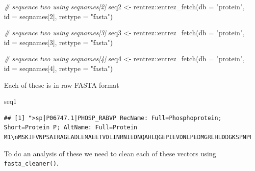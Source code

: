 \documentclass[
]{book}
\newenvironment{Shaded}{\begin{snugshade}}{\end{snugshade}}
\newcommand{\AttributeTok}[1]{\textcolor[rgb]{0.77,0.63,0.00}{#1}}
\newcommand{\CommentTok}[1]{\textcolor[rgb]{0.56,0.35,0.01}{\textit{#1}}}
\newcommand{\DecValTok}[1]{\textcolor[rgb]{0.00,0.00,0.81}{#1}}
\newcommand{\FunctionTok}[1]{\textcolor[rgb]{0.00,0.00,0.00}{#1}}
\newcommand{\NormalTok}[1]{#1}
\newcommand{\OtherTok}[1]{\textcolor[rgb]{0.56,0.35,0.01}{#1}}
\newcommand{\SpecialCharTok}[1]{\textcolor[rgb]{0.00,0.00,0.00}{#1}}
\newcommand{\StringTok}[1]{\textcolor[rgb]{0.31,0.60,0.02}{#1}}
\begin{document}
\begin{Shaded}
\begin{Highlighting}[]
\CommentTok{\# sequence two using seqnames[2]}
\NormalTok{seq2 }\OtherTok{\textless{}{-}}\NormalTok{ rentrez}\SpecialCharTok{::}\FunctionTok{entrez\_fetch}\NormalTok{(}\AttributeTok{db =} \StringTok{"protein"}\NormalTok{, }
                          \AttributeTok{id =}\NormalTok{ seqnames[}\DecValTok{2}\NormalTok{], }
                          \AttributeTok{rettype =} \StringTok{"fasta"}\NormalTok{) }

\CommentTok{\# sequence two using seqnames[3]}
\NormalTok{seq3 }\OtherTok{\textless{}{-}}\NormalTok{ rentrez}\SpecialCharTok{::}\FunctionTok{entrez\_fetch}\NormalTok{(}\AttributeTok{db =} \StringTok{"protein"}\NormalTok{, }
                          \AttributeTok{id =}\NormalTok{ seqnames[}\DecValTok{3}\NormalTok{], }
                          \AttributeTok{rettype =} \StringTok{"fasta"}\NormalTok{)}

\CommentTok{\# sequence two using seqnames[4]}
\NormalTok{seq4 }\OtherTok{\textless{}{-}}\NormalTok{ rentrez}\SpecialCharTok{::}\FunctionTok{entrez\_fetch}\NormalTok{(}\AttributeTok{db =} \StringTok{"protein"}\NormalTok{, }
                          \AttributeTok{id =}\NormalTok{ seqnames[}\DecValTok{4}\NormalTok{], }
                          \AttributeTok{rettype =} \StringTok{"fasta"}\NormalTok{)}
\end{Highlighting}
\end{Shaded}

Each of these is in raw FASTA format

\begin{Shaded}
\begin{Highlighting}[]
\NormalTok{seq1}
\end{Highlighting}
\end{Shaded}

\begin{verbatim}
## [1] ">sp|P06747.1|PHOSP_RABVP RecName: Full=Phosphoprotein; Short=Protein P; AltName: Full=Protein M1\nMSKIFVNPSAIRAGLADLEMAEETVDLINRNIEDNQAHLQGEPIEVDNLPEDMGRLHLDDGKSPNPGEMA\nKVGEGKYREDFQMDEGEDPSLLFQSYLDNVGVQIVRQIRSGERFLKIWSQTVEEIISYVAVNFPNPPGKS\nSEDKSTQTTGRELKKETTPTPSQRESQSSKARMAAQTASGPPALEWSATNEEDDLSVEAEIAHQIAESFS\nKKYKFPSRSSGILLYNFEQLKMNLDDIVKEAKNVPGVTRLARDGSKLPLRCVLGWVALANSKKFQLLVES\nNKLSKIMQDDLNRYTSC\n\n"
\end{verbatim}

To do an analysis of these we need to clean each of these vectors using \texttt{fasta\_cleaner()}.
\end{document}
